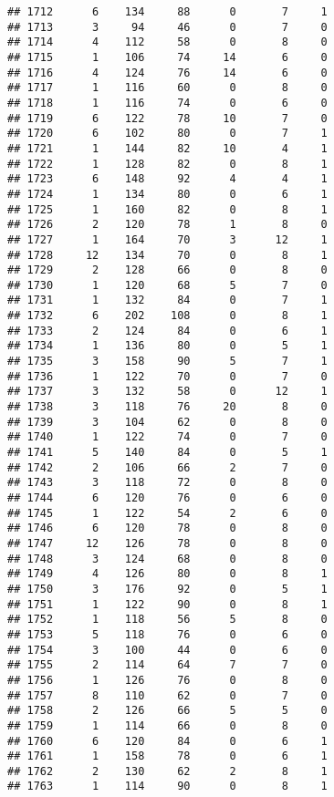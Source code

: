 \documentclass[
]{article}
\begin{document}
\begin{verbatim}
## 1712      6    134     88      0       7     1
## 1713      3     94     46      0       7     0
## 1714      4    112     58      0       8     0
## 1715      1    106     74     14       6     0
## 1716      4    124     76     14       6     0
## 1717      1    116     60      0       8     0
## 1718      1    116     74      0       6     0
## 1719      6    122     78     10       7     0
## 1720      6    102     80      0       7     1
## 1721      1    144     82     10       4     1
## 1722      1    128     82      0       8     1
## 1723      6    148     92      4       4     1
## 1724      1    134     80      0       6     1
## 1725      1    160     82      0       8     1
## 1726      2    120     78      1       8     0
## 1727      1    164     70      3      12     1
## 1728     12    134     70      0       8     1
## 1729      2    128     66      0       8     0
## 1730      1    120     68      5       7     0
## 1731      1    132     84      0       7     1
## 1732      6    202    108      0       8     1
## 1733      2    124     84      0       6     1
## 1734      1    136     80      0       5     1
## 1735      3    158     90      5       7     1
## 1736      1    122     70      0       7     0
## 1737      3    132     58      0      12     1
## 1738      3    118     76     20       8     0
## 1739      3    104     62      0       8     0
## 1740      1    122     74      0       7     0
## 1741      5    140     84      0       5     1
## 1742      2    106     66      2       7     0
## 1743      3    118     72      0       8     0
## 1744      6    120     76      0       6     0
## 1745      1    122     54      2       6     0
## 1746      6    120     78      0       8     0
## 1747     12    126     78      0       8     0
## 1748      3    124     68      0       8     0
## 1749      4    126     80      0       8     1
## 1750      3    176     92      0       5     1
## 1751      1    122     90      0       8     1
## 1752      1    118     56      5       8     0
## 1753      5    118     76      0       6     0
## 1754      3    100     44      0       6     0
## 1755      2    114     64      7       7     0
## 1756      1    126     76      0       8     0
## 1757      8    110     62      0       7     0
## 1758      2    126     66      5       5     0
## 1759      1    114     66      0       8     0
## 1760      6    120     84      0       6     1
## 1761      1    158     78      0       6     1
## 1762      2    130     62      2       8     1
## 1763      1    114     90      0       8     1

\end{verbatim}
\end{document}
